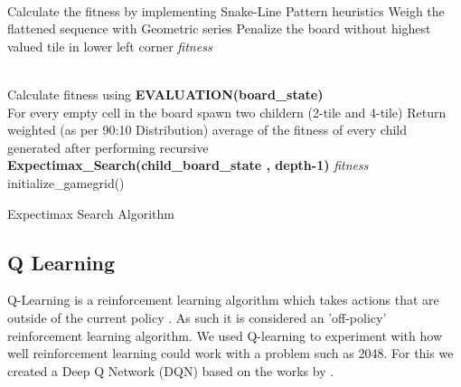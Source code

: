 \documentclass{svproc}
\begin{document}
    \begin{algorithm}[t]
    
        \SetAlgoLined
        
        \\
            Calculate the fitness by implementing Snake-Line Pattern heuristics\; Weigh the flattened sequence with Geometric series\;
            Penalize the board without highest valued tile in lower left corner\;
            \Return \textit{fitness}
        \EndFunction
        
         \\
            Calculate fitness using \textbf{EVALUATION(board\_state)}\\
              {
                 For every empty cell in the board spawn two childern (2-tile and 4-tile)\;
                Return weighted (as per 90:10 Distribution) average of the fitness\;  of every  child generated after performing recursive  \textbf{Expectimax\_Search(child\_board\_state , depth-1)}
            }
           \Return \textit{fitness}\;
        \EndFunction \newline
    initialize\_gamegrid()\;
    \caption{Expectimax Search Algorithm}
    \end{algorithm}
    
    \subsection{Q Learning}
    Q-Learning is a reinforcement learning algorithm which takes actions that are outside of the current policy \cite{watkins1992q}. As such it is considered an 'off-policy' reinforcement learning algorithm. We used Q-learning to experiment with how well reinforcement learning could work with a problem such as 2048. For this we created a Deep Q Network (DQN) based on the works by \cite{dqnGit}. 
\end{document}
